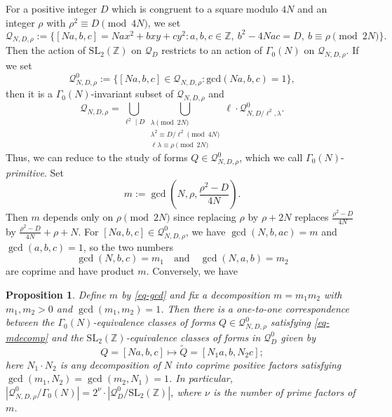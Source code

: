 \documentclass[12pt]{amsart}
\numberwithin{equation}{section}
\newtheorem{proposition}[theorem]{Proposition}
\theoremstyle{definition}
\begin{document}
For a positive integer $D$ which is congruent to a square modulo $4N$ and an integer $\rho$ with $\rho^{2}\equiv D\pmod{4N}$, we set
$$\mathcal{Q}_{N,D,\rho}:=\{[Na,b,c]=Nax^{2}+bxy+cy^{2}:a,b,c\in\mathbb{Z},~b^{2}-4Nac=D,~b\equiv\rho\pmod{2N}\}.$$
Then the action of $\mathrm{SL}_{2}(\mathbb{Z})$ on $\mathcal{Q}_{D}$ restricts to an action of $\Gamma_{0}(N)$ on $\mathcal{Q}_{N,D,\rho}$.
If we set
$$\mathcal{Q}_{N,D,\rho}^{0}:=\{[Na,b,c]\in\mathcal{Q}_{N,D,\rho}:\mathrm{gcd}(Na,b,c)=1\},$$
then it is a $\Gamma_{0}(N)$-invariant subset of $\mathcal{Q}_{N,D,\rho}$ and
$$\mathcal{Q}_{N,D,\rho}=\bigcup_{\ell^{2}\mid D}\bigcup\limits_{\substack{\lambda\pmod{2N} \\ \lambda^{2}\equiv D/\ell^{2}\pmod{4N} \\ \ell\lambda\equiv\rho\pmod{2N}}}\ell\cdot\mathcal{Q}_{N,D/\ell^{2},\lambda}^{0}.$$
Thus, we can reduce to the study of forms $Q\in\mathcal{Q}_{N,D,\rho}^{0}$, which we call $\Gamma_{0}(N)$-\textit{primitive}.
Set
\begin{equation}\label{eq-gcd}
    m:=\gcd\left(N,\rho,\frac{\rho^{2}-D}{4N}\right).
\end{equation}
Then $m$ depends only on $\rho\pmod{2N}$ since replacing $\rho$ by $\rho+2N$ replaces $\frac{\rho^{2}-D}{4N}$ by $\frac{\rho^{2}-D}{4N}+\rho+N$. 
For $[Na,b,c]\in\mathcal{Q}_{N,D,\rho}^{0}$, we have $\gcd(N,b,ac)=m$ and $\gcd(a,b,c)=1$, so the two numbers
\begin{equation}\label{eq-mdecomp}
    \gcd(N,b,c)=m_{1}\quad\text{and}\quad\gcd(N,a,b)=m_{2}
\end{equation}
are coprime and have product $m$. 
Conversely, we have

\begin{proposition}\label{prop-gkz}
    Define $m$ by \eqref{eq-gcd} and fix a decomposition $m=m_{1}m_{2}$ with $m_{1},m_{2}>0$ and $\gcd(m_{1},m_{2})=1$. Then there is a one-to-one correspondence between the $\Gamma_{0}(N)$-equivalence classes of forms $Q\in\mathcal{Q}_{N,D,\rho}^{0}$ satisfying \eqref{eq-mdecomp} and the $\mathrm{SL}_{2}(\mathbb{Z})$-equivalence classes of forms in $\mathcal{Q}_{D}^{0}$ given by
    $$Q=[Na,b,c]\mapsto\widetilde{Q}=[N_{1}a,b,N_{2}c];$$
    here $N_{1}\cdot N_{2}$ is any decomposition of $N$ into coprime positive factors satisfying $\gcd(m_{1},N_{2})=\gcd(m_{2},N_{1})=1$. In particular, $|\mathcal{Q}_{N,D,\rho}^{0}/\Gamma_{0}(N)|=2^{\nu}\cdot |\mathcal{Q}_{D}^{0}/\mathrm{SL}_{2}(\mathbb{Z})|$, where $\nu$ is the number of prime factors of $m$.
\end{proposition}
\end{document}
